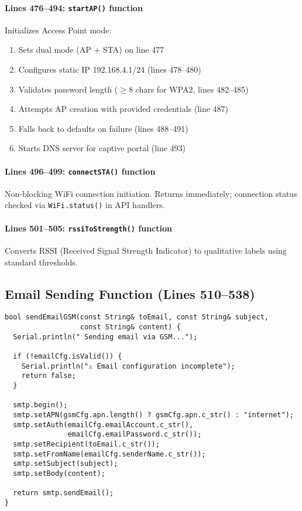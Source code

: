\documentclass[11pt,a4paper]{article}
\begin{document}
\paragraph{Lines 476--494: \texttt{startAP()} function}
Initializes Access Point mode:
\begin{enumerate}[leftmargin=*]
  \item Sets dual mode (AP + STA) on line 477
  \item Configures static IP 192.168.4.1/24 (lines 478--480)
  \item Validates password length ($\geq 8$ chars for WPA2, lines 482--485)
  \item Attempts AP creation with provided credentials (line 487)
  \item Falls back to defaults on failure (lines 488--491)
  \item Starts DNS server for captive portal (line 493)
\end{enumerate}

\paragraph{Lines 496--499: \texttt{connectSTA()} function}
Non-blocking WiFi connection initiation. Returns immediately; connection status checked via \texttt{WiFi.status()} in API handlers.

\paragraph{Lines 501--505: \texttt{rssiToStrength()} function}
Converts RSSI (Received Signal Strength Indicator) to qualitative labels using standard thresholds.

\subsection{Email Sending Function (Lines 510--538)}

\begin{verbatim}
bool sendEmailGSM(const String& toEmail, const String& subject, 
                  const String& content) {
  Serial.println(" Sending email via GSM...");
  
  if (!emailCfg.isValid()) {
    Serial.println("⚠ Email configuration incomplete");
    return false;
  }

  smtp.begin();
  smtp.setAPN(gsmCfg.apn.length() ? gsmCfg.apn.c_str() : "internet");
  smtp.setAuth(emailCfg.emailAccount.c_str(), 
               emailCfg.emailPassword.c_str());
  smtp.setRecipient(toEmail.c_str());
  smtp.setFromName(emailCfg.senderName.c_str());
  smtp.setSubject(subject);
  smtp.setBody(content);

  return smtp.sendEmail();
}
\end{verbatim}
\end{document}
